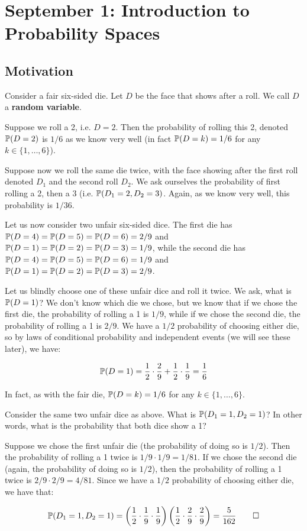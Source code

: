 \section{September 1: Introduction to Probability Spaces}

\subsection{Motivation}

Consider a fair six-sided die. Let $D$ be the face that shows after a roll. We call $D$ a \textbf{random variable}.

Suppose we roll a 2, i.e. $D = 2$. Then the probability of rolling this 2, denoted $\mathbb{P}(D = 2)$ is $1/6$ as we know very well (in fact $\mathbb{P}(D = k) = 1/6$ for any $k \in \{1,\dots,6\}$).

Suppose now we roll the same die twice, with the face showing after the first roll denoted $D_1$ and the second roll $D_2$. We ask ourselves the probability of first rolling a 2, then a 3 (i.e. $\mathbb{P}(D_1 = 2, D_2 = 3)$. Again, as we know very well, this probability is $1/36$. 

Let us now consider two unfair six-sided dice. The first die has $\mathbb{P}(D = 4) = \mathbb{P}(D = 5) = \mathbb{P}(D = 6) = 2/9$ and $\mathbb{P}(D = 1) = \mathbb{P}(D = 2) = \mathbb{P}(D = 3) = 1/9$, while the second die has $\mathbb{P}(D = 4) = \mathbb{P}(D = 5) = \mathbb{P}(D = 6) = 1/9$ and $\mathbb{P}(D = 1) = \mathbb{P}(D = 2) = \mathbb{P}(D = 3) = 2/9$.

Let us blindly choose one of these unfair dice and roll it twice. We ask, what is $\mathbb{P}(D = 1)$? We don't know which die we chose, but we know that if we chose the first die, the probability of rolling a 1 is $1/9$, while if we chose the second die, the probability of rolling a 1 is $2/9$. We have a $1/2$ probability of choosing either die, so by laws of conditional probability and independent events (we will see these later), we have:

\[\mathbb{P}(D = 1) = \displaystyle\frac{1}{2} \cdot \displaystyle\frac{2}{9} + \displaystyle\frac{1}{2} \cdot \displaystyle\frac{1}{9} = \displaystyle\frac{1}{6} \]

In fact, as with the fair die, $\mathbb{P}(D = k) = 1/6$ for any $k \in \{1, \dots, 6\}$.

\begin{example}
   Consider the same two unfair dice as above. What is $\mathbb{P}(D_1 = 1, D_2 = 1)$? In other words, what is the probability that both dice show a 1?
\end{example}
\begin{solution}
   Suppose we chose the first unfair die (the probability of doing so is $1/2$). Then the probability of rolling a 1 twice is $1/9 \cdot 1/9 = 1/81$. If we chose the second die (again, the probability of doing so is $1/2$), then the probability of rolling a 1 twice is $2/9 \cdot 2/9 = 4/81$. Since we have a $1/2$ probability of choosing either die, we have that:

   \[ \mathbb{P}(D_1 = 1, D_2 = 1) = \left(\displaystyle\frac{1}{2}\cdot\displaystyle\frac{1}{9}\cdot\displaystyle\frac{1}{9}\right)\left(\displaystyle\frac{1}{2}\cdot\displaystyle\frac{2}{9}\cdot\displaystyle\frac{2}{9}\right) = \displaystyle\frac{5}{162} \qedhere \] 
\end{solution}

